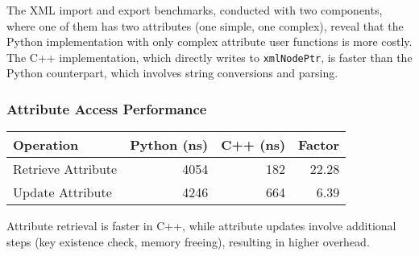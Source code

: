 The XML import and export benchmarks, conducted with two components, where one of them has two attributes (one simple, one complex), reveal that the Python implementation with only complex attribute user functions is more costly. The C++ implementation, which directly writes to \texttt{xmlNodePtr}, is faster than the Python counterpart, which involves string conversions and parsing.

\subsubsection{Attribute Access Performance}

\begin{center}
\begin{tabular}{lrrr}
\textbf{Operation} & \textbf{Python (ns)} & \textbf{C++ (ns)} & \textbf{Factor} \\
\hline
Retrieve Attribute & 4054 & 182 & 22.28 \\
Update Attribute & 4246 & 664 & 6.39 \\
\end{tabular}
\end{center}

Attribute retrieval is faster in C++, while attribute updates involve additional steps (key existence check, memory freeing), resulting in higher overhead.
